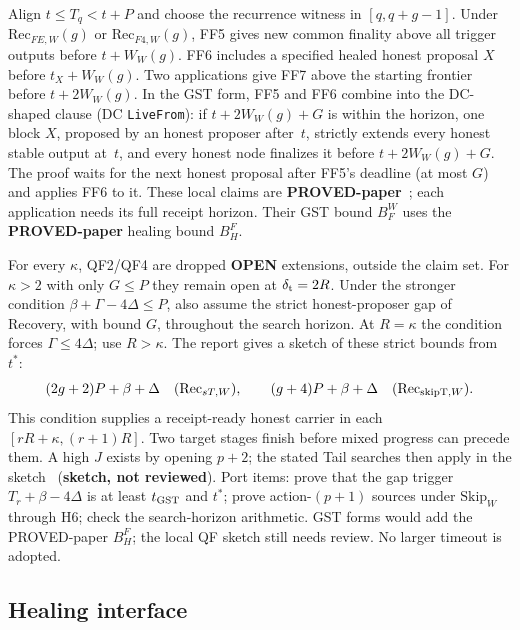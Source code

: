 \documentclass{article}
\theoremstyle{plain}
\theoremstyle{definition}
\theoremstyle{remark}
\newcommand{\OPEN}{\textbf{OPEN}}
\begin{document}
Align $t\leq T_q<t+P$ and choose the recurrence witness in $[q,q+g-1]$.
Under $\mathrm{Rec}_{FE,W}(g)$ or $\mathrm{Rec}_{F4,W}(g)$, FF5 gives
new common finality above all trigger outputs before $t+W_W(g)$.
FF6 includes a specified healed honest proposal $X$ before $t_X+W_W(g)$.
Two applications give FF7 above the starting frontier before $t+2W_W(g)$.
In the GST form, FF5 and FF6 combine into the DC-shaped clause (DC \texttt{LiveFrom}):
if $t+2W_W(g)+G$ is within the horizon, one block $X$, proposed by an honest proposer
after~$t$, strictly extends every honest stable output at~$t$, and every honest node
finalizes it before $t+2W_W(g)+G$.  The proof waits for the next honest proposal
after FF5's deadline (at most $G$) and applies FF6 to it.
These local claims are \textbf{PROVED-paper}~\cite[\S5]{FW}; each application
needs its full receipt horizon.  Their GST bound $B_F^W$ uses the
\textbf{PROVED-paper} healing bound $B_H^F$.

For every $\kappa$, QF2/QF4 are dropped \OPEN{} extensions, outside the claim set.  For $\kappa>2$ with only $G\leq P$ they remain open at
$\delta_{\rm t}=2R$.  Under the stronger condition
$\beta+\Gamma-4\Delta\leq P$, also assume the strict honest-proposer gap
of Recovery, with bound $G$, throughout the search horizon.
At $R=\kappa$ the condition forces $\Gamma\leq4\Delta$; use $R>\kappa$.
The report gives a sketch of these strict bounds from $t^*$:
\[
 (2g+2)P+\beta+\Delta\quad(\mathrm{Rec}_{sT,W}),\qquad
 (g+4)P+\beta+\Delta\quad(\mathrm{Rec}_{{\rm skipT},W}).
\]
This condition supplies a receipt-ready honest carrier in each
$[rR+\kappa,(r+1)R]$.  Two target stages finish before mixed progress
can precede them.  A high $J$ exists by opening $p+2$; the stated Tail
searches then apply in the sketch~\cite[\S5]{FW} (\textbf{sketch, not reviewed}).
Port items: prove that the gap trigger $T_r+\beta-4\Delta$ is at least
$t_{\rm GST}$ and $t^*$; prove action-$(p+1)$ sources under
$\mathrm{Skip}_W$ through H6; check the search-horizon arithmetic.
GST forms would add the PROVED-paper $B_H^F$; the local QF sketch still needs review.
No larger timeout is adopted.

\subsection{Healing interface}\label{sec:healing-interface}
\end{document}
